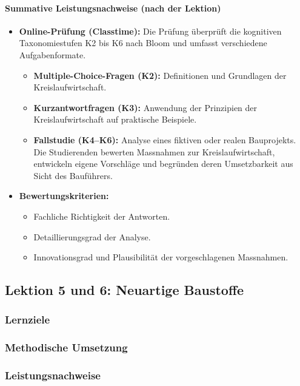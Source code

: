\documentclass[
11pt,
captions=tableheading,
smallheadings,
headsepline,
footsepline, 
captions=tableheading,
parskip=half-,
]{scrartcl}
\begin{document}
\paragraph{Summative Leistungsnachweise (nach der Lektion)}
\begin{itemize}
    \item \textbf{Online-Prüfung (Classtime):}
          Die Prüfung überprüft die kognitiven Taxonomiestufen K2 bis K6 nach Bloom und umfasst verschiedene Aufgabenformate.
          \begin{itemize}
              \item \textbf{Multiple-Choice-Fragen (K2):}
                    Definitionen und Grundlagen der Kreislaufwirtschaft.
              \item \textbf{Kurzantwortfragen (K3):}
                    Anwendung der Prinzipien der Kreislaufwirtschaft auf praktische Beispiele.
              \item \textbf{Fallstudie (K4–K6):}
                    Analyse eines fiktiven oder realen Bauprojekts. Die Studierenden bewerten Massnahmen zur Kreislaufwirtschaft, entwickeln eigene Vorschläge und begründen deren Umsetzbarkeit aus Sicht des Bauführers.
          \end{itemize}
    \item \textbf{Bewertungskriterien:}
          \begin{itemize}
              \item Fachliche Richtigkeit der Antworten.
              \item Detaillierungsgrad der Analyse.
              \item Innovationsgrad und Plausibilität der vorgeschlagenen Massnahmen.
          \end{itemize}
\end{itemize}






\subsection{Lektion 5 und 6: Neuartige Baustoffe}
\subsubsection{Lernziele}
\subsubsection{Methodische Umsetzung}
\subsubsection{Leistungsnachweise}
\end{document}
